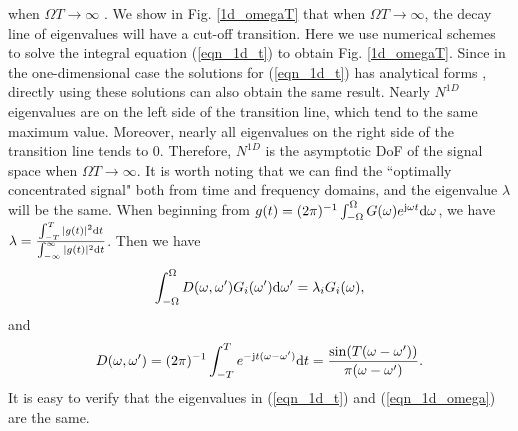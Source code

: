 \documentclass[12pt,draftclsnofoot,journal,onecolumn]{IEEEtran}
\begin{document}
	when $\Omega T \rightarrow \infty$ \cite{slepian1961prolate}. We show in Fig. \ref{1d_omegaT} that when $\Omega T \rightarrow \infty$, the decay line of eigenvalues will have a cut-off transition. {\color{red} Here we use numerical schemes to solve the integral equation (\ref{eqn_1d_t}) to obtain Fig. \ref{1d_omegaT}. Since in the one-dimensional case the solutions for (\ref{eqn_1d_t}) has analytical forms \cite{slepian1961prolate}, directly using these solutions can also obtain the same result.} Nearly $N^{1D}$ eigenvalues are on the left side of the transition line, which tend to the same maximum value. Moreover, nearly all eigenvalues on the right side of the transition line tends to 0. Therefore, $N^{1D}$ is the asymptotic DoF of the signal space when $\Omega T \rightarrow \infty$. {\color{red}It is worth noting that we can find the ``optimally concentrated signal" both from time and frequency domains, and the eigenvalue $\lambda$ will be the same. When beginning from $g(t) = (2\pi)^{-1}\int_{-\Omega}^{\Omega}G(\omega)e^{{\rm j}\omega t} {\rm d}\omega$, we have $\lambda = \frac{\int_{-T}^{T}|g(t)|^2{\rm d}t}{\int_{-\infty}^{\infty}|g(t)|^2{\rm d}t}$. Then we have 
	\begin{equation}
	\begin{aligned}
		\int_{-\Omega}^{\Omega}D(\omega,\omega')G_i(\omega'){\rm d}\omega' = \lambda_i G_i(\omega),
	\end{aligned}
	\label{eqn_1d_omega}
	\end{equation}
	and
	\begin{equation}
		\begin{aligned}
			D(\omega,\omega') = (2\pi)^{-1}\int_{-T}^T e^{-{\rm j}t(\omega-\omega')}{\rm d}t = \frac{\sin(T(\omega-\omega'))}{\pi(\omega-\omega')}.
		\end{aligned}
	\end{equation}
	It is easy to verify that the eigenvalues in (\ref{eqn_1d_t}) and (\ref{eqn_1d_omega}) are the same.
	}
	
\end{document}
